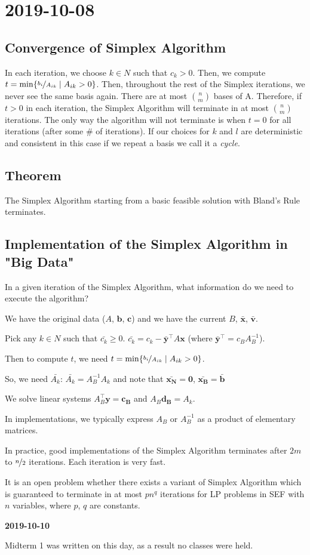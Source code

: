 \section{2019-10-08}
\subsection{Convergence of Simplex Algorithm}
In each iteration, we choose $k\in N$ such that $c_k>0$. Then, we compute 
$t=\min\{\nicefrac{b_i}{A_{ik}}\mid A_{ik}>0\}$. Then, throughout the
rest of the Simplex iterations, we never see the same basis again. 
There are at most $\binom{n}{m}$ bases of A. Therefore, if $t>0$ in each iteration,
the Simplex Algorithm will terminate in at most $\binom{n}{m}$ iterations. The only
way the algorithm will not terminate is when $t=0$ for all iterations
(after some \# of iterations). If our choices for $k$ and $l$ are deterministic and
consistent in this case if we repeat a basis we call it a \emph{cycle}.

\begin{thmbox}
    \subsection{Theorem}
    The Simplex Algorithm starting from a basic feasible solution with
    Bland's Rule terminates.
\end{thmbox}

\subsection{Implementation of the Simplex Algorithm in "Big Data"}
In a given iteration of the Simplex Algorithm, what information do we need to
execute the algorithm?


We have the original data ($A$, $\bm{b}$, $\bm{c}$) and we have the
current $B$, $\bm{\bar{x}}$, $\bm{\bar{v}}$.

Pick any $k\in N$ such that $\bar{c_k}\ge 0$. $\bar{c_k}=c_k-\bm{\bar{y}}^\top  A\bm{x}$ 
(where $\bm{\bar{y}}^\top =c_B A_B^{-1}$).

Then to compute $t$, we need
$t=\min\{\nicefrac{b_i}{A_{ik}}\mid A_{ik}>0\}$.

So, we need
$\bar{A_k}$: $\bar{A_k}=A_B^{-1}A_k$ and note that $\bm{\bar{x_N}}=\bm{0}$,
$\bm{\bar{x_B}}=\bm{\bar{b}}$


We solve linear systems $A_B^\top \bm{y}=\bm{c_B}$ and $A_B\bm{d_B}=A_k$.

In implementations, we typically express $A_B$ or $A_B^{-1}$ as a product of elementary
matrices.

In practice, good implementations of the Simplex Algorithm terminates after $2m$ to
$\nicefrac{n}{2}$ iterations. Each iteration is very fast.

It is an open problem whether there exists a variant of Simplex Algorithm which is
guaranteed to terminate in at most $pn^q$ iterations for LP problems in SEF with $n$
variables, where $p$, $q$ are constants.

\textbf{2019-10-10}

Midterm 1 was written on this day, as a result no classes were
held.